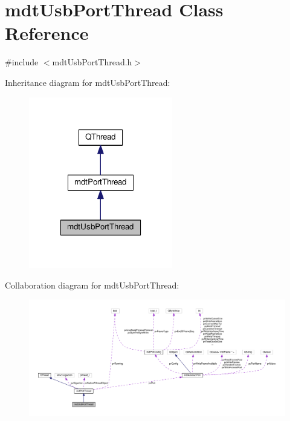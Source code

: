 \hypertarget{classmdt_usb_port_thread}{\section{mdt\-Usb\-Port\-Thread Class Reference}
\label{classmdt_usb_port_thread}
}


{\ttfamily \#include $<$mdt\-Usb\-Port\-Thread.\-h$>$}



Inheritance diagram for mdt\-Usb\-Port\-Thread\-:\nopagebreak
\begin{figure}[H]
\begin{center}
\leavevmode
\includegraphics[width=178pt]{classmdt_usb_port_thread__inherit__graph}
\end{center}
\end{figure}


Collaboration diagram for mdt\-Usb\-Port\-Thread\-:
\nopagebreak
\begin{figure}[H]
\begin{center}
\leavevmode
\includegraphics[width=350pt]{classmdt_usb_port_thread__coll__graph}
\end{center}
\end{figure}
